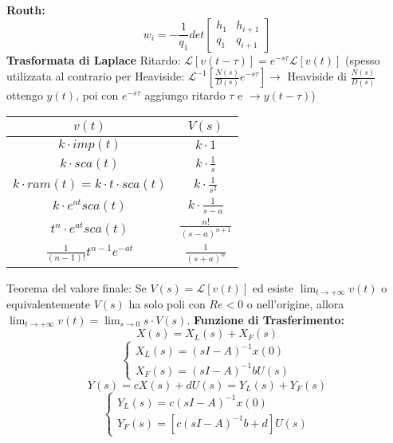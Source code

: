 \textbf{Routh:}
\[
    w_i = - \frac{1}{q_1} det\left[\begin{matrix}
        h_1 & h_{i+1} \\
        q_1 & q_{i+1}
    \end{matrix}\right]
\]
\textbf{Trasformata di Laplace}\newline
Ritardo: $\mathcal{L}[ v(t - \tau)] = e^{-s \tau} \mathcal{L}[v(t)]$ (spesso utilizzata al contrario per Heaviside: $\mathcal{L}^{-1}\left[\frac{N(s)}{D(s)}e^{-s \tau}\right] \rightarrow $ Heaviside di $\frac{N(s)}{D(s)}$ ottengo $y(t)$, poi con $e^{-s \tau}$ aggiungo ritardo $\tau$ e $\rightarrow  y(t- \tau)$)
\renewcommand{\arraystretch}{2}
    \begin{center}
        \begin{tabular}{ |c|c| } 
        \hline
        \;\;\;\;\;\;\;\;\;\;\;\;\;\;\;$v(t)$ \;\;\;\;\;\;\;\;\;\;\;\;\;\;\;& \;\;\;\;\;\;\;\;\;\;\;\;\;\;\;$V(s)$ \;\;\;\;\;\;\;\;\;\;\;\;\;\;\;\\ 
        \hline
        $k \cdot imp(t)$ & $k \cdot 1$ \\ 
        $k \cdot sca(t)$ & $k \cdot \frac{1}{s}$  \\ 
        $k \cdot ram(t) =k \cdot t \cdot  sca(t)$ & $k \cdot \frac{1}{s^2}$ \\
        $k \cdot e^{at}sca(t)$ & $k \cdot \frac{1}{s-a}$ \\ 
        $t^{n}\cdot e^{at}sca(t)$ & $\frac{n!}{(s-a)^{n+1}}$\\ 
        $\frac{1}{(n-1)!} t^{n-1}e^{-at}$ & $\frac{1}{(s+a)^n}$\\
        \hline
        \end{tabular}
    \end{center}
    \renewcommand{\arraystretch}{1}
Teorema del valore finale: Se $V(s) = \mathcal{L}[v(t)]$ ed esiste $\lim_{t\rightarrow +\infty} v(t)$ o equivalentemente $V(s)$ ha solo poli con $Re< 0$ o nell'origine, allora $\lim_{t\rightarrow +\infty} v(t) = \lim_{s\rightarrow 0} s \cdot V(s)$.\newline
\textbf{Funzione di Trasferimento:}
\[
    X(s) = X_L(s) + X_F(s)
\]
\[
    \begin{cases}
        X_L(s) = (sI-A)^{-1} x(0)\\
        X_F(s) = (sI-A) ^{-1} b U(s)
    \end{cases}
\]
\[
    Y(s) = cX(s) + dU(s) = Y_L(s) + Y_F(s)
\]
\[
    \begin{cases}
        Y_L(s) = c(sI-A)^{-1} x(0)\\
        Y_F(s) = [c(sI-A)^{-1} b + d]U(s)
    \end{cases}
\]
